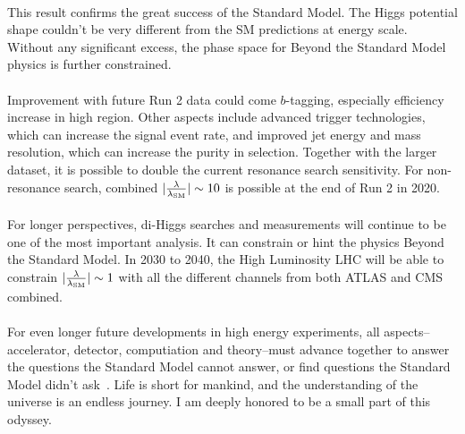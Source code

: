 \paragraph{}
This result confirms the great success of the Standard Model.
The Higgs potential shape couldn't be very different from the SM predictions at \TeV energy scale.
Without any significant excess, the phase space for Beyond the Standard Model physics is further constrained.

\paragraph{}
Improvement with future Run 2 data could come $b$-tagging, especially efficiency increase in high \pt region. Other aspects include advanced trigger technologies, which can increase the signal event rate, and improved jet energy and mass resolution, which can increase the purity in selection. Together with the larger dataset, it is possible to double the current resonance search sensitivity. For non-resonance search, combined $|\frac{\rm\lambda}{\rm\lambda_{SM}}| \sim 10$ is possible at the end of Run 2 in 2020.

\paragraph{}
For longer perspectives, di-Higgs searches and measurements will continue to be one of the most important analysis. It can constrain or hint the physics Beyond the Standard Model. In 2030 to 2040, the High Luminosity LHC will be able to constrain $|\frac{\rm\lambda}{\rm\lambda_{SM}}| \sim 1$ with all the different channels from both ATLAS and CMS combined. 

\paragraph{}
For even longer future developments in high energy experiments, all aspects--accelerator, detector, computiation and theory--must advance together to answer the questions the Standard Model cannot answer, or find questions the Standard Model didn't ask~\cite{Richter:2014pga, Hawking:2018tcn}. Life is short for mankind, and the understanding of the universe is an endless journey. I am deeply honored to be a small part of this odyssey.

